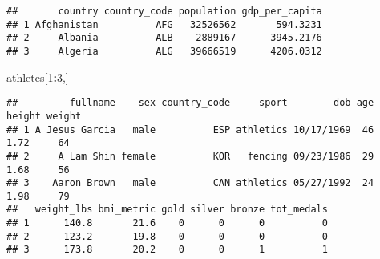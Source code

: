 \documentclass[]{article}
\newenvironment{Shaded}{\begin{snugshade}}{\end{snugshade}}
\newcommand{\CommentTok}[1]{\textcolor[rgb]{0.56,0.35,0.01}{\textit{#1}}}
\newcommand{\DataTypeTok}[1]{\textcolor[rgb]{0.13,0.29,0.53}{#1}}
\newcommand{\DecValTok}[1]{\textcolor[rgb]{0.00,0.00,0.81}{#1}}
\newcommand{\KeywordTok}[1]{\textcolor[rgb]{0.13,0.29,0.53}{\textbf{#1}}}
\newcommand{\NormalTok}[1]{#1}
\newcommand{\OperatorTok}[1]{\textcolor[rgb]{0.81,0.36,0.00}{\textbf{#1}}}
\newcommand{\OtherTok}[1]{\textcolor[rgb]{0.56,0.35,0.01}{#1}}
\newcommand{\StringTok}[1]{\textcolor[rgb]{0.31,0.60,0.02}{#1}}
\begin{document}
\begin{Shaded}
\end{Shaded}

\begin{verbatim}
##       country country_code population gdp_per_capita
## 1 Afghanistan          AFG   32526562       594.3231
## 2     Albania          ALB    2889167      3945.2176
## 3     Algeria          ALG   39666519      4206.0312
\end{verbatim}

\begin{Shaded}
\begin{Highlighting}[]
\NormalTok{    athletes[}\DecValTok{1}\OperatorTok{:}\DecValTok{3}\NormalTok{,]}
\end{Highlighting}
\end{Shaded}

\begin{verbatim}
##         fullname    sex country_code     sport        dob age height weight
## 1 A Jesus Garcia   male          ESP athletics 10/17/1969  46   1.72     64
## 2     A Lam Shin female          KOR   fencing 09/23/1986  29   1.68     56
## 3    Aaron Brown   male          CAN athletics 05/27/1992  24   1.98     79
##   weight_lbs bmi_metric gold silver bronze tot_medals
## 1      140.8       21.6    0      0      0          0
## 2      123.2       19.8    0      0      0          0
## 3      173.8       20.2    0      0      1          1
\end{verbatim}

\begin{Shaded}
\end{Shaded}
\end{document}
